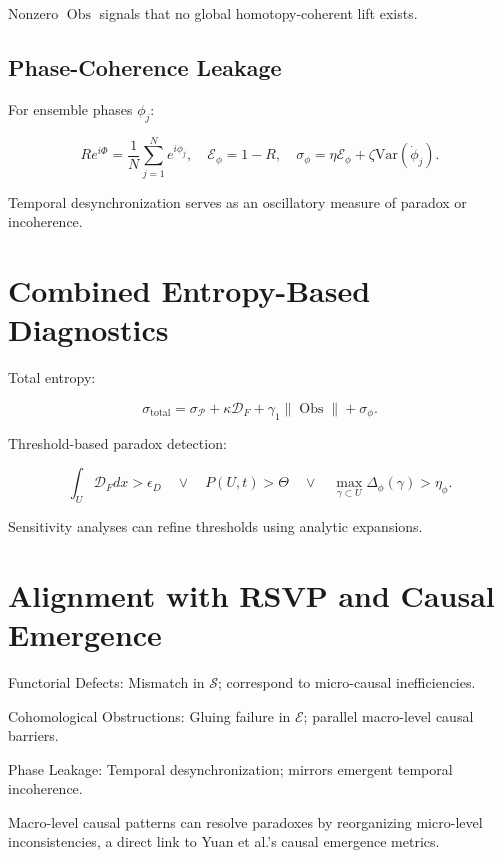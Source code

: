 \documentclass[12pt]{article}
\theoremstyle{plain}
\begin{document}
Nonzero \(\operatorname{Obs}\) signals that no global homotopy-coherent lift exists.

\subsection{Phase-Coherence Leakage}

For ensemble phases \(\phi_j\):

\begin{equation}
R e^{i\Phi} = \frac{1}{N}\sum_{j=1}^N e^{i\phi_j}, \quad \mathcal{E}_\phi = 1 - R, \quad \sigma_\phi = \eta \mathcal{E}_\phi + \zeta \mathrm{Var}(\dot{\phi}_j).
\end{equation}

Temporal desynchronization serves as an oscillatory measure of paradox or incoherence.

\section{Combined Entropy-Based Diagnostics}

Total entropy:

\begin{equation}
\sigma_{\mathrm{total}} = \sigma_\mathcal{P} + \kappa \mathcal{D}_F + \gamma_1 \|\operatorname{Obs}\| + \sigma_\phi.
\end{equation}

Threshold-based paradox detection:

\begin{equation}
\int_U \mathcal{D}_F dx > \epsilon_D \quad \vee \quad P(U,t) > \Theta \quad \vee \quad \max_{\gamma \subset U} \Delta_\phi(\gamma) > \eta_\phi.
\end{equation}

Sensitivity analyses can refine thresholds using analytic expansions.

\section{Alignment with RSVP and Causal Emergence}

Functorial Defects: Mismatch in \(\mathcal{S}\); correspond to micro-causal inefficiencies.

Cohomological Obstructions: Gluing failure in \(\mathcal{E}\); parallel macro-level causal barriers.

Phase Leakage: Temporal desynchronization; mirrors emergent temporal incoherence.

Macro-level causal patterns can resolve paradoxes by reorganizing micro-level inconsistencies, a direct link to Yuan et al.’s causal emergence metrics.
\end{document}
